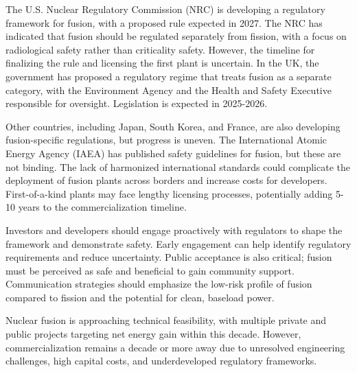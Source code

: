 \documentclass[10pt,a4paper]{article}
\begin{document}
{\small The U.S. Nuclear Regulatory Commission (NRC) is developing a regulatory framework for fusion, with a proposed rule expected in 2027. The NRC has indicated that fusion should be regulated separately from fission, with a focus on radiological safety rather than criticality safety. However, the timeline for finalizing the rule and licensing the first plant is uncertain. In the UK, the government has proposed a regulatory regime that treats fusion as a separate category, with the Environment Agency and the Health and Safety Executive responsible for oversight. Legislation is expected in 2025-2026.}\par
{\small Other countries, including Japan, South Korea, and France, are also developing fusion-specific regulations, but progress is uneven. The International Atomic Energy Agency (IAEA) has published safety guidelines for fusion, but these are not binding. The lack of harmonized international standards could complicate the deployment of fusion plants across borders and increase costs for developers. First-of-a-kind plants may face lengthy licensing processes, potentially adding 5-10 years to the commercialization timeline.}\par
{\small Investors and developers should engage proactively with regulators to shape the framework and demonstrate safety. Early engagement can help identify regulatory requirements and reduce uncertainty. Public acceptance is also critical; fusion must be perceived as safe and beneficial to gain community support. Communication strategies should emphasize the low-risk profile of fusion compared to fission and the potential for clean, baseload power.}\par
{\small Nuclear fusion is approaching technical feasibility, with multiple private and public projects targeting net energy gain within this decade. However, commercialization remains a decade or more away due to unresolved engineering challenges, high capital costs, and underdeveloped regulatory frameworks.}\par
\label{chap:3:end}
\end{document}
